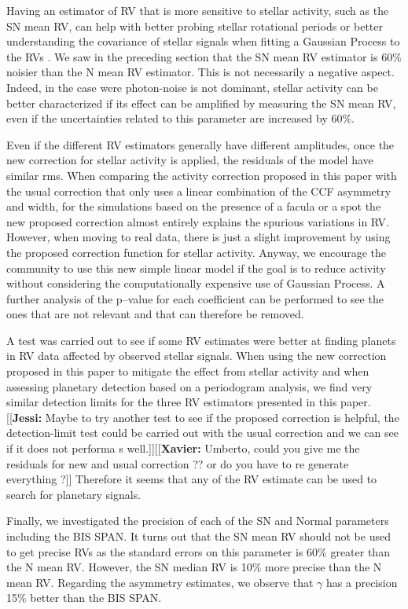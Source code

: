 \documentclass{aa}
\newcommand{\jessi}[1]{{\color{Purple}[[\textbf{Jessi: }#1]]}}
\newcommand{\xavier}[1]{{\color{blue}[[\textbf{Xavier: }#1]]}}
\begin{document}
Having an estimator of RV that is more sensitive to stellar activity, such as the SN mean RV, can help with better probing stellar rotational periods or better understanding the covariance of stellar signals when fitting a Gaussian Process to the RVs \citep[e.g.][]{Faria-2016a, Haywood-2014}. 
We saw in the preceding section that the SN mean RV estimator is 60\% noisier than the N mean RV estimator. 
This is not necessarily a negative aspect. 
Indeed, in the case were photon-noise is not dominant, stellar activity can be better characterized if its effect can be amplified by measuring the SN mean RV, even if the uncertainties related to this parameter are increased by 60\%.

Even if the different RV estimators generally have different amplitudes, once the new correction for stellar activity is applied, the residuals of the model have similar rms.
When comparing the activity correction proposed in this paper with the usual correction that only uses a linear combination of the CCF asymmetry and width, for the simulations based on the presence of a facula or a spot the new proposed correction almost entirely explains the spurious variations in RV. However, when moving to real data, there is just a slight improvement by using the proposed correction function for stellar activity. Anyway, we encourage the community to use this new simple linear model if the goal is to reduce activity without considering the computationally expensive use of Gaussian Process. 
A further analysis of the p--value for each coefficient can be performed to see the ones that are not relevant and that can therefore be removed.

A test was carried out to see if some RV estimates were better at finding planets in RV data affected by observed stellar signals. 
When using the new correction proposed in this paper to mitigate the effect from stellar activity and when assessing planetary detection based on a periodogram analysis, we find very similar detection limits for the three RV estimators presented in this paper. 
\jessi{Maybe to try another test to see if the proposed correction is helpful, the detection-limit test could be carried out with the usual correction and we can see if it does not performa s well.}\xavier{Umberto, could you give me the residuals for new and usual correction ?? or do you have to re generate everything ?}
Therefore it seems that any of the RV estimate can be used to search for planetary signals.

Finally, we investigated the precision of each of the SN and Normal parameters including the BIS SPAN. It turns out that the SN mean RV should not be used to get precise RVs as the standard errors on this parameter is 60\% greater than the N mean RV. 
However, the SN median RV is 10\% more precise than the N mean RV. 
Regarding the asymmetry estimates, we observe that $\gamma$ has a precision 15\% better than the BIS SPAN.
\end{document}
